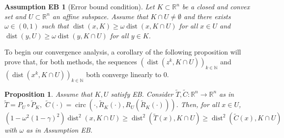\documentclass[smallextended,numbook,nospthms]{svjour3}
\theoremstyle{plain}
\newtheorem{proposition}[theorem]{Proposition}
\newtheorem*{assumption}{Assumption EB}
\theoremstyle{definition}
\def\RR{\mathds R}
\def\NN{\mathds N}
\DeclareMathOperator{\dist}{dist}
\DeclareMathOperator{\circum}{circ}
\begin{document}
\begin{assumption}[Error bound condition]\label{eb}
Let $K \subset \RR^{n}$ be a closed and convex set  and $U \subset \RR^{n}$ an affine subspace. Assume that $K \cap U \neq \emptyset$ and there exists $\omega \in(0,1)$ such that $\dist(x, K) \geq \omega \dist\left(x, K \cap U\right)$ for all $x \in U$ and $\dist(y, U) \geq \omega \dist\left(y, K \cap U\right)$ for all $y \in K$.
\end{assumption}

To begin our convergence analysis, a corollary of the following proposition will prove that, for both methods, the sequences $\left(\dist\left(z^{k}, K \cap U\right)\right)_{k \in \NN}$ and $\left(\dist\left(x^{k}, K \cap U\right)\right)_{k \in \NN}$ both converge linearly to $0$.

\begin{proposition}\label{prop:EB dist}
	Assume that $K, U$ satisfy EB. Consider $\tilde{T}, \tilde{C}: \RR^{n} \rightarrow \RR^{n}$ as in $\tilde{T}=P_{U} \circ \tilde{P}_{K},$ $\tilde{C}(\cdot)=\circum\left(\cdot, \tilde{R}_{K}(\cdot), R_{U}\left(\tilde{R}_{K}(\cdot)\right)\right)$. Then, for all $x \in U$,
	\begin{equation}\label{eq:dist KcapU AMAP CARM}
		\left(1-\omega^{2}(1-\gamma)^2\right) \dist^{2}(x, K \cap U) \geq \dist^{2}(\tilde{T}(x), K \cap U) \geq \dist^{2}(\tilde{C}(x), K \cap U)
	\end{equation}
	with $\omega$ as in Assumption EB.
\end{proposition}
\end{document}
